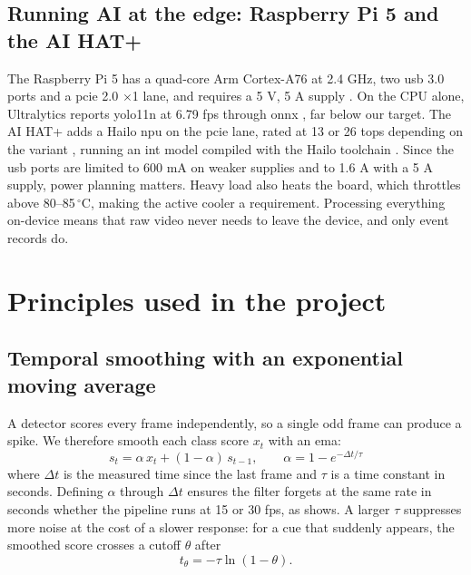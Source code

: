 \subsection{Running AI at the edge: Raspberry Pi 5 and the AI HAT+}

The Raspberry Pi 5 has a quad-core Arm Cortex-A76 at 2.4 GHz, two \gls{usb} 3.0 ports and a \gls{pcie} 2.0 $\times$1 lane, and requires a 5 V, 5 A supply \cite{r50}. On the CPU alone, Ultralytics reports \gls{yolo}11n at 6.79 \gls{fps} through \gls{onnx} \cite{r52}, far below our target. The AI HAT+ adds a Hailo \gls{npu} on the \gls{pcie} lane, rated at 13 or 26 \gls{tops} depending on the variant \cite{r51}, running an \gls{int} model compiled with the Hailo toolchain \cite{r70}. Since the \gls{usb} ports are limited to 600 mA on weaker supplies and to 1.6 A with a 5 A supply, power planning matters. Heavy load also heats the board, which throttles above 80--85\,$^\circ$C, making the active cooler a requirement. Processing everything on-device means that raw video never needs to leave the device, and only event records do.

\section{Principles used in the project}
\subsection{Temporal smoothing with an exponential moving average}

A detector scores every frame independently, so a single odd frame can produce a spike. We therefore smooth each class score $x_t$ with an \gls{ema}:
\begin{equation}
s_t = \alpha\,x_t + (1-\alpha)\,s_{t-1}, \qquad \alpha = 1 - e^{-\Delta t/\tau}
\label{eq:ema}
\end{equation}
where $\Delta t$ is the measured time since the last frame and $\tau$ is a time constant in seconds. Defining $\alpha$ through $\Delta t$ ensures the filter forgets at the same rate in seconds whether the pipeline runs at 15 or 30 \gls{fps}, as  shows. A larger $\tau$ suppresses more noise at the cost of a slower response: for a cue that suddenly appears, the smoothed score crosses a cutoff $\theta$ after
\begin{equation}
t_\theta = -\tau \ln(1-\theta).
\label{eq:delay}
\end{equation}

